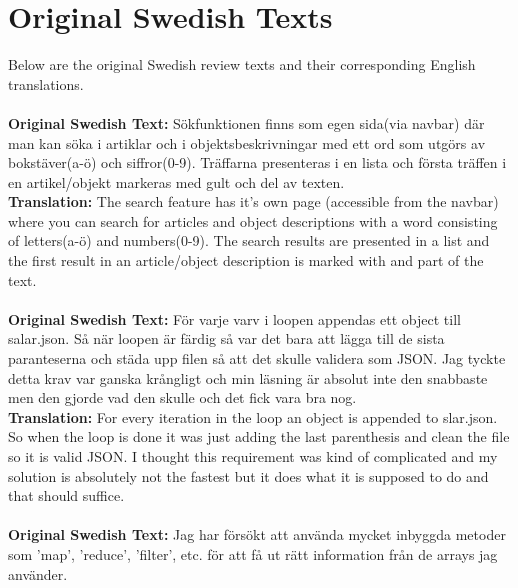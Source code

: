 \documentclass[twoside,twocolumn,a4paper,11pt,english]{article}
\begin{document}




\newpage

\appendix

\section{Original Swedish Texts} \label{app:original}

Below are the original Swedish review texts and their corresponding English translations.
\\
\\
\textbf{Original Swedish Text:} Sökfunktionen finns som egen sida(via navbar) där man kan söka i artiklar och i objektsbeskrivningar med ett ord som utgörs av bokstäver(a-ö) och siffror(0-9). Träffarna presenteras i en lista och första träffen i en artikel/objekt markeras med gult och del av texten.
\\
\textbf{Translation:} The search feature has it's own page (accessible from the navbar) where you can search for articles and object descriptions with a word consisting of letters(a-ö) and numbers(0-9). The search results are presented in a list and the first result in an article/object description is marked with and part of the text.
\\
\\
\textbf{Original Swedish Text:} För varje varv i loopen appendas ett object till salar.json. Så när loopen är färdig så var det bara att lägga till de sista paranteserna och städa upp filen så att det skulle validera som JSON. Jag tyckte detta krav var ganska krångligt och min läsning är absolut inte den snabbaste men den gjorde vad den skulle och det fick vara bra nog.
\\
\textbf{Translation:} For every iteration in the loop an object is appended to slar.json. So when the loop is done it was just adding the last parenthesis and clean the file so it is valid JSON. I thought this requirement was kind of complicated and my solution is absolutely not the fastest but it does what it is supposed to do and that should suffice.
\\
\\
\textbf{Original Swedish Text:} Jag har försökt att använda mycket inbyggda metoder som 'map', 'reduce', 'filter', etc. för att få ut rätt information från de arrays jag använder.
\end{document}
